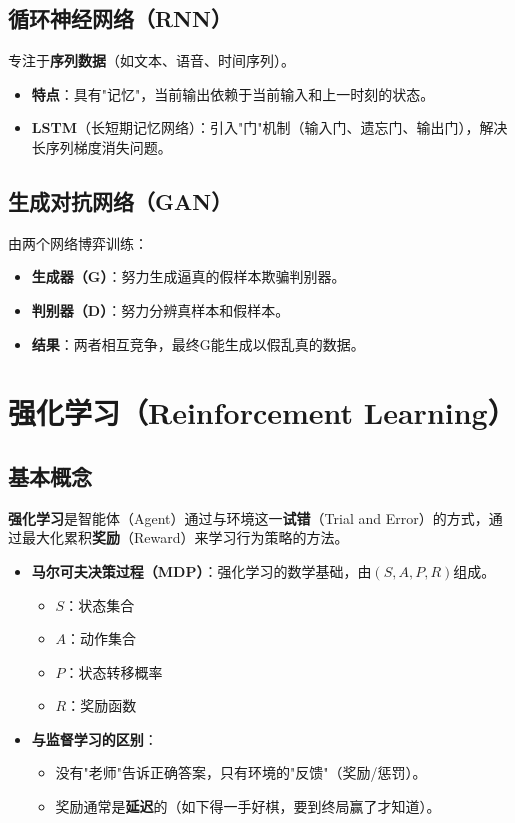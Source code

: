 \subsection{循环神经网络（RNN）}
专注于\textbf{序列数据}（如文本、语音、时间序列）。
\begin{itemize}[leftmargin=2em,itemsep=0pt]
    \item \textbf{特点}：具有"记忆"，当前输出依赖于当前输入和上一时刻的状态。
    \item \textbf{LSTM}（长短期记忆网络）：引入"门"机制（输入门、遗忘门、输出门），解决长序列梯度消失问题。
\end{itemize}

\subsection{生成对抗网络（GAN）}
由两个网络博弈训练：
\begin{itemize}[leftmargin=2em,itemsep=0pt]
    \item \textbf{生成器（G）}：努力生成逼真的假样本欺骗判别器。
    \item \textbf{判别器（D）}：努力分辨真样本和假样本。
    \item \textbf{结果}：两者相互竞争，最终G能生成以假乱真的数据。
\end{itemize}

\section{强化学习（Reinforcement Learning）}

\subsection{基本概念}
\begin{conceptbox}
\textbf{强化学习}是智能体（Agent）通过与环境这一\textbf{试错}（Trial and Error）的方式，通过最大化累积\textbf{奖励}（Reward）来学习行为策略的方法。
\end{conceptbox}

\begin{itemize}[leftmargin=2em,itemsep=0pt]
    \item \textbf{马尔可夫决策过程（MDP）}：强化学习的数学基础，由$(S, A, P, R)$组成。
    \begin{itemize}
        \item $S$：状态集合
        \item $A$：动作集合
        \item $P$：状态转移概率
        \item $R$：奖励函数
    \end{itemize}
    \item \textbf{与监督学习的区别}：
    \begin{itemize}
        \item 没有"老师"告诉正确答案，只有环境的"反馈"（奖励/惩罚）。
        \item 奖励通常是\textbf{延迟}的（如下得一手好棋，要到终局赢了才知道）。
    \end{itemize}
\end{itemize}

